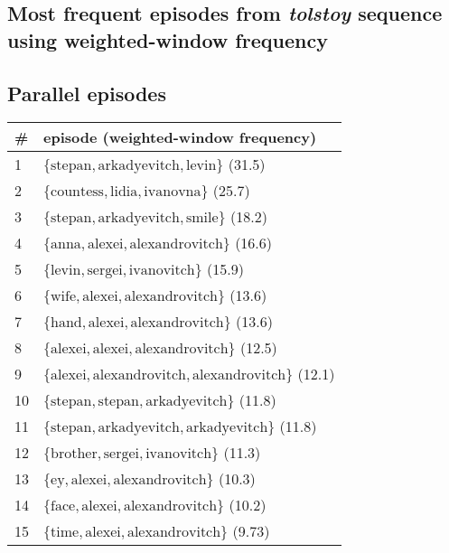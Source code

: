 \begin{appendices}

\iffalse
\chapter{Most frequent episodes from \emph{tolstoy} sequence using weighted-window frequency}

\section{Parallel episodes}

\begin{longtable}{p{20pt}|p{\dimexpr\textwidth-20pt-\tabcolsep\relax}}
\# & episode (weighted-window frequency) \\
\hline
1 &  $ \{ \text{stepan},\allowbreak \text{arkadyevitch},\allowbreak \text{levin} \} $ (31.5) \\
2 &  $ \{ \text{countess},\allowbreak \text{lidia},\allowbreak \text{ivanovna} \} $ (25.7) \\
3 &  $ \{ \text{stepan},\allowbreak \text{arkadyevitch},\allowbreak \text{smile} \} $ (18.2) \\
4 &  $ \{ \text{anna},\allowbreak \text{alexei},\allowbreak \text{alexandrovitch} \} $ (16.6) \\
5 &  $ \{ \text{levin},\allowbreak \text{sergei},\allowbreak \text{ivanovitch} \} $ (15.9) \\
6 &  $ \{ \text{wife},\allowbreak \text{alexei},\allowbreak \text{alexandrovitch} \} $ (13.6) \\
7 &  $ \{ \text{hand},\allowbreak \text{alexei},\allowbreak \text{alexandrovitch} \} $ (13.6) \\
8 &  $ \{ \text{alexei},\allowbreak \text{alexei},\allowbreak \text{alexandrovitch} \} $ (12.5) \\
9 &  $ \{ \text{alexei},\allowbreak \text{alexandrovitch},\allowbreak \text{alexandrovitch} \} $ (12.1) \\
10 & $ \{ \text{stepan},\allowbreak \text{stepan},\allowbreak \text{arkadyevitch} \} $ (11.8) \\
11 & $ \{ \text{stepan},\allowbreak \text{arkadyevitch},\allowbreak \text{arkadyevitch} \} $ (11.8) \\
12 & $ \{ \text{brother},\allowbreak \text{sergei},\allowbreak \text{ivanovitch} \} $ (11.3) \\
13 & $ \{ \text{ey},\allowbreak \text{alexei},\allowbreak \text{alexandrovitch} \} $ (10.3) \\
14 & $ \{ \text{face},\allowbreak \text{alexei},\allowbreak \text{alexandrovitch} \} $ (10.2) \\
15 & $ \{ \text{time},\allowbreak \text{alexei},\allowbreak \text{alexandrovitch} \} $ (9.73) \\
\end{longtable}


\end{appendices}
